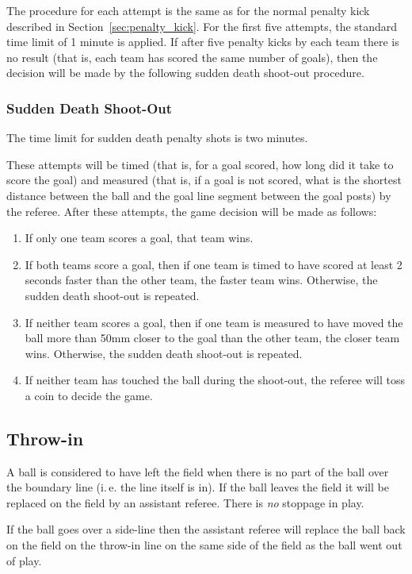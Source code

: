 \documentclass[12pt]{article}
\newcommand{\ie}{\mbox{i.\,e.}\xspace}
\begin{document}
The procedure for each attempt is the same as for the normal penalty
kick described in Section~\ref{sec:penalty_kick}. For the first five
attempts, the standard time limit of 1 minute is applied. If after five penalty kicks by each team
there is no result (that is, each team has scored the same number of goals), then the decision will be made by the following sudden death shoot-out procedure.

\subsubsection{Sudden Death Shoot-Out}

The time limit for sudden death penalty shots is two minutes.

These attempts will be timed (that is, for a goal scored, how long did it take to score the goal) and measured (that is, if a goal is not scored, what is the shortest distance between the ball and the goal line segment between the goal posts) by the referee. After these attempts, the game decision will be made as follows:
\begin{enumerate}
  \item {If only one team scores a goal, that team wins.}
  \item {If both teams score a goal, then if one team is timed to have scored at least 2 seconds faster than the other team, the faster team wins. Otherwise, the sudden death shoot-out is repeated.}
  \item {If neither team scores a goal, then if one team is measured to have moved the ball more than 50mm closer to the goal than the other team, the closer team wins. Otherwise, the sudden death shoot-out is repeated.}
  \item {If neither team has touched the ball during the shoot-out, the referee will toss a coin to decide the game.}
\end{enumerate}

\subsection{Throw-in}

A ball is considered to have left the field when there is no part of the ball
over the boundary line  (\ie the line itself is in).
If the ball leaves the field it will be replaced on the field by an
assistant referee. There is \emph{no} stoppage in play.

If the ball goes over a side-line then the assistant referee will
replace the ball back on the field on the throw-in line on the same
side of the field as the ball went out of play.
\end{document}
